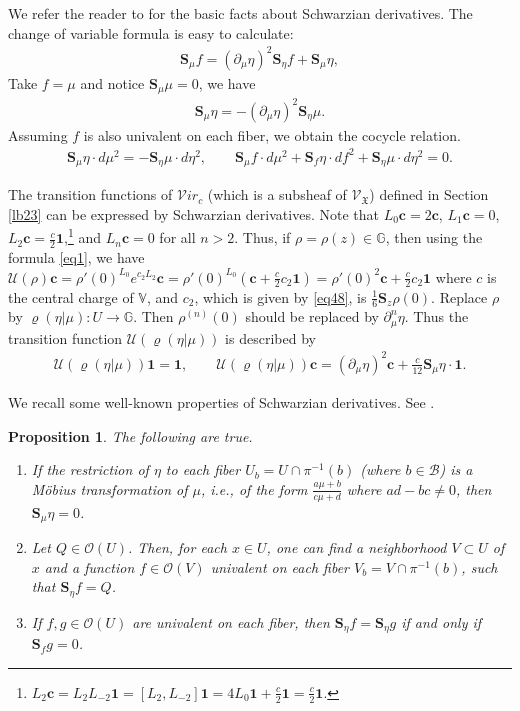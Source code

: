 \documentclass[11pt,b5paper,notitlepage]{article}
\theoremstyle{definition}
\theoremstyle{plain}
\newtheorem{pp}[df]{Proposition}
\newcommand{\fk}{\mathfrak}
\newcommand{\mc}{\mathcal}
\newcommand{\id}{\mathbf{1}}
\newcommand{\scr}{\mathscr}
\newcommand{\Vbb}{\mathbb V}
\newcommand{\Gbb}{\mathbb G}
\newcommand{\cbf}{\mathbf c}
\newcommand{\svir}{\mathcal V\!\mathit{ir}}
\newcommand{\Sbf}{\mathbf{S}}
\numberwithin{equation}{section}
\begin{document}
We refer the reader to \cite{Ahl,Gun} for the basic facts about Schwarzian derivatives. The change of variable formula is easy to calculate:
\begin{align}\label{eq45}
\Sbf_\mu f =(\partial_\mu\eta)^2 \Sbf_\eta f+\Sbf_\mu\eta,
\end{align}
Take $f=\mu$ and notice $\Sbf_\mu\mu=0$, we have
\begin{align}
\Sbf_\mu\eta=-(\partial_\mu\eta)^2\Sbf_\eta\mu.\label{eq46}
\end{align}
Assuming $f$ is also univalent on each fiber, we obtain the cocycle relation.
\begin{align}
\Sbf_\mu\eta\cdot d\mu^2=-\Sbf_\eta\mu\cdot d\eta^2,\qquad \Sbf_\mu f\cdot d\mu^2 + \Sbf_f \eta\cdot df^2+\Sbf_\eta\mu\cdot d\eta^2=0.\label{eq49}
\end{align}




The transition functions of $\svir_c$ (which is a subsheaf of $\scr V_{\fk X}$) defined in Section \ref{lb23} can be expressed by Schwarzian derivatives. Note that $L_0\cbf=2\cbf$, $L_1\cbf=0$, $L_2\cbf=\frac c 2\id$,\footnote{$L_2\cbf=L_2L_{-2}\id=[L_2,L_{-2}]\id=4L_0\id+\frac c 2\id=\frac c 2\id$.} and $L_n\cbf=0$ for all $n>2$. Thus,  if $\rho=\rho(z)\in\Gbb$, then using the formula \eqref{eq1}, we have $\mc U(\rho)\cbf=\rho'(0)^{L_0}e^{c_2L_2}\cbf=\rho'(0)^{L_0}(\cbf+\frac c2c_2\id)=\rho'(0)^2\cbf+\frac c2c_2\id$ where $c$ is the central charge of $\Vbb$, and $c_2$, which is given by \eqref{eq48}, is $\frac 16\Sbf_z\rho(0)$. Replace $\rho$ by $\varrho(\eta|\mu):U\rightarrow\Gbb$. Then $\rho^{(n)}(0)$ should be replaced by $\partial_\mu^n\eta$. Thus the transition function $\mc U(\varrho(\eta|\mu))$ is described by
\begin{gather}
\mc U(\varrho(\eta|\mu))\id=\id,\qquad  \mc U(\varrho(\eta|\mu))\cbf=(\partial_\mu\eta)^2\cbf+\frac {c}{12}\Sbf_\mu\eta \cdot \id.\label{eq47}
\end{gather}



We recall some well-known properties of  Schwarzian derivatives. See \cite{Hub81}.

\begin{pp}\label{lb24}
	The following are true.
	\begin{enumerate}[label=(\arabic*)]
		\item If the restriction of $\eta$ to each fiber $U_b=U\cap\pi^{-1}(b)$ (where $b\in\mc B$) is a M\"obius transformation of $\mu$, i.e., of the form $\frac{a\mu+b}{c\mu+d}$ where $ad-bc\neq 0$, then $\Sbf_\mu \eta=0$.
		\item  Let $Q\in\scr O(U)$. Then, for each $x\in U$, one can find a neighborhood $V\subset U$ of $x$ and a function $f\in\scr O(V)$ univalent on each fiber $V_b=V\cap\pi^{-1}(b)$, such that $\Sbf_\eta f=Q$.
		\item If $f,g\in\scr O(U)$ are univalent on each fiber, then $\Sbf_\eta f=\Sbf_\eta g$ if and only if $\Sbf_f g=0$.
	\end{enumerate}
\end{pp}
\end{document}
